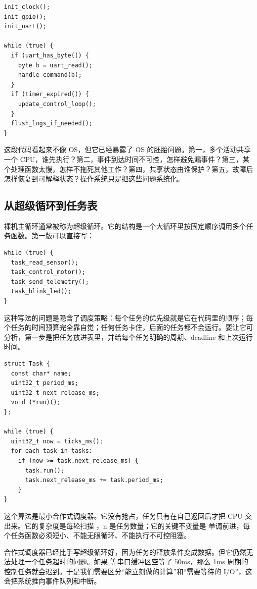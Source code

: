 \begin{lstlisting}
init_clock();
init_gpio();
init_uart();

while (true) {
  if (uart_has_byte()) {
    byte b = uart_read();
    handle_command(b);
  }
  if (timer_expired()) {
    update_control_loop();
  }
  flush_logs_if_needed();
}
\end{lstlisting}

这段代码看起来不像 OS，但它已经暴露了 OS 的胚胎问题。第一，多个活动共享一个 CPU，谁先执行？第二，事件到达时间不可控，怎样避免漏事件？第三，某个处理函数太慢，怎样不拖死其他工作？第四，共享状态由谁保护？第五，故障后怎样恢复到可解释状态？操作系统只是把这些问题系统化。

\subsection{从超级循环到任务表}

裸机主循环通常被称为超级循环。它的结构是一个大循环里按固定顺序调用多个任务函数。第一版可以直接写：

\begin{lstlisting}
while (true) {
  task_read_sensor();
  task_control_motor();
  task_send_telemetry();
  task_blink_led();
}
\end{lstlisting}

这种写法的问题是隐含了调度策略：每个任务的优先级就是它在代码里的顺序；每个任务的时间预算完全靠自觉；任何任务卡住，后面的任务都不会运行。要让它可分析，第一步是把任务放进表里，并给每个任务明确的周期、deadline 和上次运行时间。

\begin{lstlisting}
struct Task {
  const char* name;
  uint32_t period_ms;
  uint32_t next_release_ms;
  void (*run)();
};

while (true) {
  uint32_t now = ticks_ms();
  for each task in tasks:
    if (now >= task.next_release_ms) {
      task.run();
      task.next_release_ms += task.period_ms;
    }
}
\end{lstlisting}

这个算法是最小合作式调度器。它没有抢占，任务只有在自己返回后才把 CPU 交出来。它的复杂度是每轮扫描 ，n 是任务数量；它的关键不变量是  单调前进，每个任务函数必须短小、不能无限循环、不能执行不可控阻塞。

合作式调度器已经比手写超级循环好，因为任务的释放条件变成数据。但它仍然无法处理一个任务超时的问题。如果  等串口缓冲区空等了 50ms，那么 1ms 周期的控制任务就会迟到。于是我们需要区分“能立刻做的计算”和“需要等待的 I/O”，这会把系统推向事件队列和中断。

